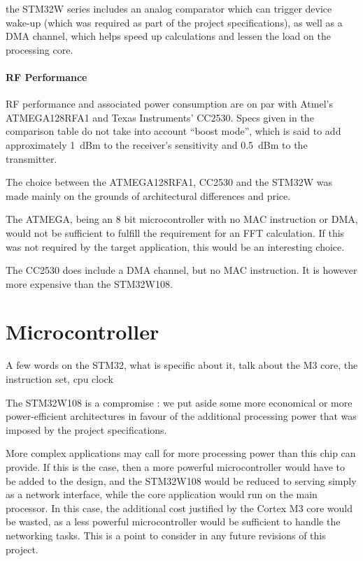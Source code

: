 the STM32W series includes an analog comparator which
can trigger device wake-up (which was required as part of the project
specifications), as well as a \ac{DMA} channel, which helps speed up
calculations and lessen the load on the processing core.

\paragraph{RF Performance} 

RF performance and associated power consumption are
on par with Atmel's ATMEGA128RFA1 and Texas Instruments' CC2530. Specs given in
the comparison table do not take into account ``boost mode'', which is said to
add approximately \SI{1}{dBm} to the receiver's sensitivity and \SI{0.5}{dBm} to
the transmitter.

The choice between the ATMEGA128RFA1, CC2530 and the STM32W was made mainly on
the grounds of architectural differences and price.

The ATMEGA, being an 8 bit microcontroller with no MAC instruction or DMA, would
not be sufficient to fulfill the requirement for an FFT calculation. If this was
not required by the target application, this would be an interesting choice.

The CC2530 does include a DMA channel, but no MAC instruction. It is however
more expensive than the STM32W108. 

\section{Microcontroller}

A few words on the STM32, what is specific about it, talk about the M3 core, the
instruction set, cpu clock

The STM32W108 is a compromise : we put aside some more economical or more
power-efficient architectures in favour of the additional processing power that
was imposed by the project specifications.

More complex applications may call for more processing power than this chip can
provide. If this is the case, then a more powerful microcontroller would have to
be added to the design, and the STM32W108 would be reduced to serving simply as
a network interface, while the core application would run on the main processor.
In this case, the additional cost justified by the Cortex M3 core would be
wasted, as a less powerful microcontroller would be sufficient to handle the
networking tasks. This is a point to consider in any future revisions of this
project.
